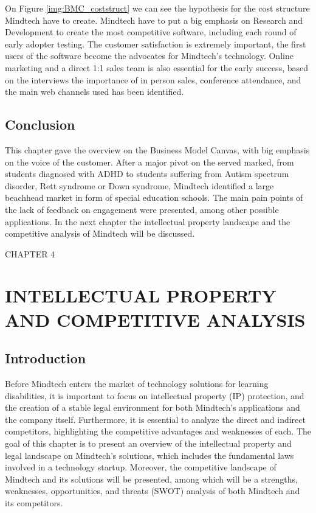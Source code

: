 \documentclass[letterpaper,10pt]{article}
\let\oldsection\section
\let\oldsubsection\subsection
\renewcommand{\section}{\def\cursectioning{section}\oldsection}
\renewcommand{\subsection}{\def\cursectioning{subsection}\oldsubsection}
\begin{document}
On Figure \ref{img:BMC_coststruct} we can see the hypothesis for the cost structure Mindtech have to create. Mindtech have to put a big emphasis on Research and Development to create the most competitive software, including each round of early adopter testing. The customer satisfaction is extremely important, the first users of the software become the advocates for Mindtech's technology. Online marketing and a direct 1:1 sales team is also essential for the early success, based on the interviews the importance of in person sales, conference attendance, and the main web channels used has been identified.





\subsection{Conclusion}

This chapter gave the overview on the Business Model Canvas, with big emphasis on the voice of the customer. After a major pivot on the served marked, from students diagnosed with ADHD to students suffering from Autism spectrum disorder, Rett syndrome or Down syndrome, Mindtech identified a large beachhead market in form of special education schools. The main pain points of the lack of feedback on engagement were presented, among other possible applications. In the next chapter the intellectual property landscape and the competitive analysis of Mindtech will be discussed.


\newpage
\newpage
\newpage


\newpage
\vspace{600mm}
\begin{center}
\uppercase{\Large{Chapter 4}}
\section{\uppercase{\large{Intellectual property and competitive analysis}}} 
\vspace{20mm}
\end{center}

\subsection{Introduction}

Before Mindtech enters the market of technology solutions for learning disabilities, it is important to focus on intellectual property (IP) protection, and the creation of a stable legal environment for both Mindtech’s applications and the company itself. Furthermore, it is essential to analyze the direct and indirect competitors, highlighting the competitive advantages and weaknesses of each.
The goal of this chapter is to present an overview of the intellectual property and legal landscape on Mindtech's solutions, which includes the fundamental laws involved in a technology startup. Moreover, the competitive landscape of Mindtech and its solutions will be presented, among which will be a strengths, weaknesses, opportunities, and threats (SWOT) analysis of both Mindtech and its competitors. 
\end{document}
